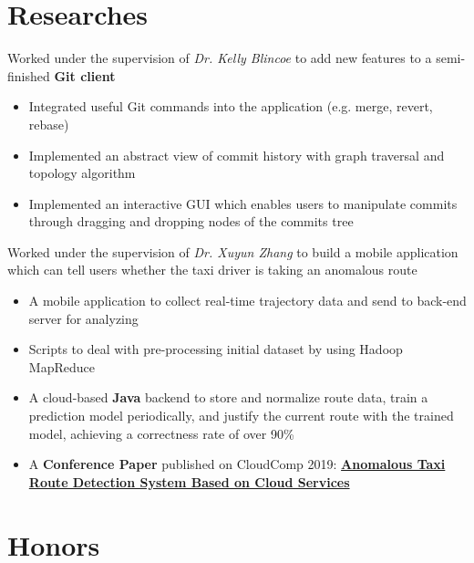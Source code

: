 \documentclass{resume}
\begin{document}
\section{Researches}
\begin{flushleft}
Worked under the supervision of \textit{Dr. Kelly Blincoe} to add new features to a semi-finished \textbf{Git client}
\begin{itemize}
    \item Integrated useful Git commands into the application (e.g. merge, revert, rebase)
    \item Implemented an abstract view of commit history with graph traversal and topology algorithm
    \item Implemented an interactive GUI which enables users to manipulate commits through dragging and \linebreak dropping nodes of the commits tree
\end{itemize}
Worked under the supervision of \textit{Dr. Xuyun Zhang} to build a mobile application which can tell users whether \linebreak the taxi driver is taking an anomalous route
\begin{itemize}
    \item A mobile application to collect real-time trajectory data and send to back-end server for analyzing
    \item Scripts to deal with pre-processing initial dataset by using Hadoop MapReduce
    \item A cloud-based \textbf{Java} backend to store and normalize route data, train a prediction model periodically, \linebreak and justify the current route with the trained model, achieving a correctness rate of over 90\%
    \item A \textbf{Conference Paper} published on CloudComp 2019: \href{https://doi.org/10.1007/978-3-030-48513-9_20}{\textbf{Anomalous Taxi Route Detection System \linebreak Based on Cloud Services}}
\end{itemize}
\end{flushleft}

\section{Honors}
\end{document}

